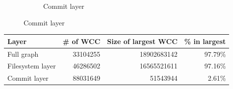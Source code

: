 \documentclass[aspectratio=169,xcolor=table]{beamer}
\begin{document}
\begin{frame}
\begin{figure}
\begin{subfigure}{.49\textwidth}
                \caption{Commit layer}
            \end{subfigure}
        \end{figure}

        \begin{tabular}[t]{l r r r}
            \textbf{Layer} & \textbf{\# of WCC}
            & \textbf{Size of largest WCC}
            & \textbf{\% in largest}
            \\
            \hline
            Full graph       & \num{33104255}  & \num{18902683142} & 97.79\% \\
            Filesystem layer & \num{46286502}  & \num{16565521611} & 97.16\% \\
            Commit layer     & \num{88031649}  & \num{51543944}    & 2.61\% \\
        \end{tabular}
    \end{frame}
\end{document}
